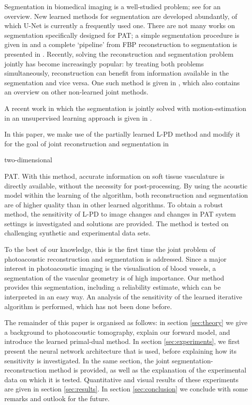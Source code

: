 \documentclass[journal]{IEEEtran}
\newcommand{\hl}[1]{\cbcolor{red}\begin{changebar}{\color{red} #1}\end{changebar}}
\begin{document}
Segmentation in biomedical imaging is a well-studied problem; see \cite{Acton2009} for an overview. New learned methods for segmentation are developed abundantly, of which U-Net \cite{Ronneberger2015} is currently a frequently used one. There are not many works on segmentation specifically designed for PAT; a simple segmentation procedure is given in \cite{Soetikno2012} and a complete `pipeline' from FBP reconstruction to segmentation is presented in \cite{Raumonen2018}. Recently, solving the reconstruction and segmentation problem jointly has become increasingly popular: by treating both problems simultaneously, reconstruction can benefit from information available in the segmentation and vice versa. One such method is given in \cite{Corona2018}, which also contains an overview on other non-learned joint methods. \hl{A recent work in which the segmentation is jointly solved with motion-estimation in an unsupervised learning approach is given in \cite{Qin2018}.}

In this paper, we make use of the partially learned L-PD method and modify it for the goal of joint reconstruction and segmentation in \hl{two-dimensional} PAT. With this method, accurate information on soft tissue vasculature is directly available, without the necessity for post-processing. By using the acoustic model within the learning of the algorithm, both reconstruction and segmentation are of higher quality than in other learned algorithms. To obtain a robust method, the sensitivity of L-PD to image changes and changes in PAT system settings is investigated and solutions are provided. The method is tested on challenging synthetic and experimental data sets. 

To the best of our knowledge, this is the first time the joint problem of photoacoustic reconstruction and segmentation is addressed. Since a major interest in photoacoustic imaging is the visualisation of blood vessels, a segmentation of the vascular geometry is of high importance. Our method provides this segmentation, including a reliability estimate, which can be interpreted in an easy way. An analysis of the sensitivity of the learned iterative algorithm is performed, which has not been done before.

The remainder of this paper is organised as follows: in section \ref{sec:theory} we give a background to photoacoustic tomography, explain our forward model, and introduce the learned primal-dual method. In section \ref{sec:experiments}, we first present the neural network architecture that is used, before explaining how its sensitivity is investigated. In the same section, the joint segmentation-reconstruction method is provided, as well as the explanation of the experimental data on which it is tested. Quantitative and visual results of these experiments are given in section \ref{sec:results}. In section \ref{sec:conclusion} we conclude with some remarks and outlook for the future.
\end{document}
